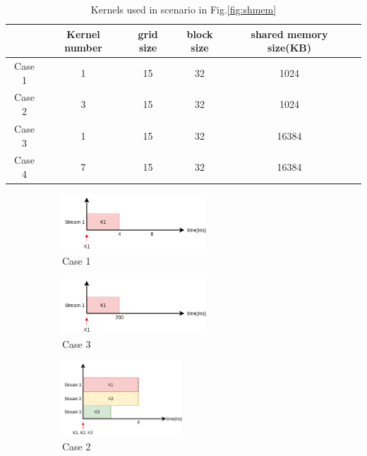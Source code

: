 \documentclass[conference]{IEEEtran}
\begin{document}
\begin{table}[h]
   \caption{Kernels used in scenario in Fig.\ref{fig:shmem}}
   \centering
   \begin{tabular}{|c|c|c|c|c|c|}
   \hline
    & \bf Kernel number & \bf grid size & \bf block size & \bf shared memory size(KB) \\
    \hline
   Case 1 & 1 & 15 & 32 & 1024   \\
   Case 2 & 3 & 15 & 32 & 1024  \\ 
   Case 3 & 1 & 15 & 32 & 16384  \\
   Case 4 & 7 & 15 & 32 & 16384  \\
   \hline
   \end{tabular}
   \label{table:shmem_kernel}
\end{table}

\begin{figure}[h]
   \centering
   \begin{subfigure}{0.4\textwidth}
      \includegraphics[width=\textwidth, height=60pt]{figs/shmem_1024_baseline.png}
      \caption{Case 1}
      \label{fig:shmem_case1}
   \end{subfigure}
   \begin{subfigure}{0.4\textwidth}
      \includegraphics[width=\textwidth, height=60pt]{figs/shmem_16384_baseline.png}
      \caption{Case 3}
      \label{fig:shmem_case3}
   \end{subfigure}
   \begin{subfigure}{0.38\textwidth}
      \includegraphics[width=\textwidth, height=80pt]{figs/shmem_1024.png}
      \caption{Case 2}
      \label{fig:shmem_case2}
  \end{subfigure}
   \begin{subfigure}{0.48\textwidth}

\end{subfigure}
\end{figure}
\end{document}
